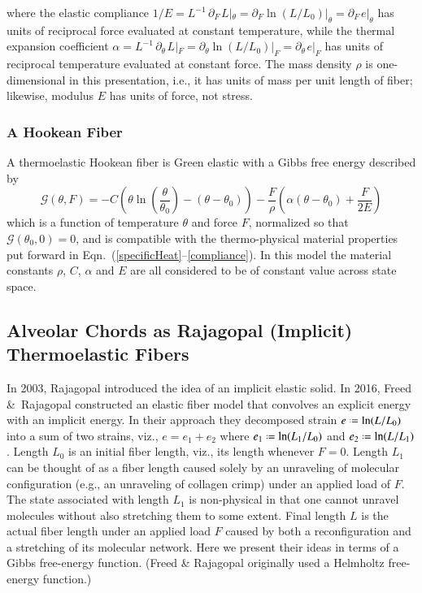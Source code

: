 where the elastic compliance $1/E = L^{-1} \, \partial_{F\,} L |_{\theta } = \partial_{F} \ln (L / L_0) |_{\theta } = \partial_{F\,} e |_{\theta }$ has units of reciprocal force evaluated at constant temperature, while the thermal expansion coefficient $\alpha = L^{-1} \, \partial_{\theta\,} L |_F = \partial_{\theta} \ln (L/L_0) |_F = \partial_{\theta\,} e |_F$ has units of reciprocal temperature evaluated at constant force.  The mass density $\rho$ is one-dimensional in this presentation, i.e., it has units of mass per unit length of fiber; likewise, modulus $E$ has units of force, not stress.

\subsubsection{A Hookean Fiber}

A thermoelastic Hookean fiber is Green elastic with a Gibbs free energy described by
\begin{equation}
    \mathcal{G} (\theta , F) = -C \left( \theta \ln \left( \frac{\theta}{\theta_0} \right) - 
    (\theta - \theta_0) \right) - 
    \frac{F}{\rho} \left( \alpha ( \theta - \theta_0 ) + \frac{F}{2E} \right)
    \label{GreenEnergy}
\end{equation}
which is a function of temperature $\theta$ and force $F$, normalized so that $\mathcal{G} (\theta_0 , 0) = 0$, and is compatible with the thermo-physical material properties put forward in Eqn.~(\ref{specificHeat}--\ref{compliance}).  In this model the material constants $\rho$, $C$, $\alpha$ and $E$ are all considered to be of constant value across state space.

\subsection{Alveolar Chords as Rajagopal (Implicit) Thermoelastic Fibers}

In 2003, Rajagopal \cite{Rajagopal03} introduced the idea of an implicit elastic solid.  In 2016, Freed \&\ Rajagopal \cite{FreedRajagopal16} constructed an elastic fiber model that convolves an explicit energy with an implicit energy.  In their approach they decomposed strain $e \defeq \ln (L / L_0)$ into a sum of two strains, viz., $e = e_1 + e_2$ where $e_1 \defeq \ln (L_1 / L_0)$ and $e_2 \defeq \ln (L / L_1)$.  Length $L_0$ is an initial fiber length, viz., its length whenever $F = 0$.  Length $L_1$ can be thought of as a fiber length caused solely by an unraveling of molecular configuration (e.g., an unraveling of collagen crimp) under an applied load of $F$.  The state associated with length $L_1$ is non-physical in that one cannot unravel molecules without also stretching them to some extent.  Final length $L$ is the actual fiber length under an applied load $F$ caused by both a reconfiguration and a stretching of its molecular network.  Here we present their ideas in terms of a Gibbs free-energy function. (Freed \& Rajagopal originally used a Helmholtz free-energy function.)

